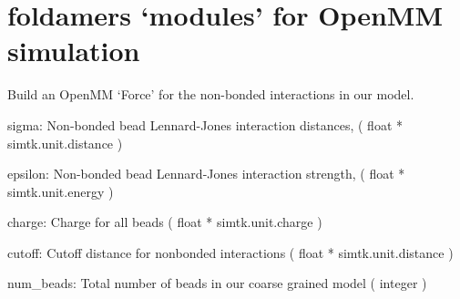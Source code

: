 \documentclass[letterpaper,10pt,english]{sphinxmanual}
\begin{document}
\section{foldamers ‘modules’ for OpenMM simulation}
\label{\detokenize{openmm:module-openmm}}\label{\detokenize{openmm:foldamers-modules-for-openmm-simulation}}

\begin{fulllineitems}
\label{\detokenize{openmm:openmm.build_mm_force}}
Build an OpenMM ‘Force’ for the non-bonded interactions in our model.

sigma: Non-bonded bead Lennard-Jones interaction distances,
( float * simtk.unit.distance )

epsilon: Non-bonded bead Lennard-Jones interaction strength,
( float * simtk.unit.energy )

charge: Charge for all beads
( float * simtk.unit.charge )

cutoff: Cutoff distance for nonbonded interactions
( float * simtk.unit.distance )

num\_beads: Total number of beads in our coarse grained model
( integer )

\end{fulllineitems}

\end{document}
